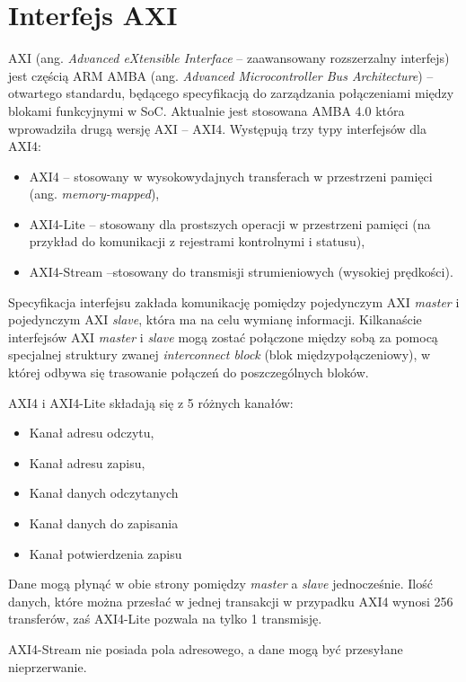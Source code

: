 \section{Interfejs AXI}
AXI (ang. \textit{Advanced eXtensible Interface} -- zaawansowany rozszerzalny interfejs) jest częścią ARM AMBA (ang.\textit{ Advanced Microcontroller Bus Architecture}) -- otwartego standardu, będącego specyfikacją do zarządzania połączeniami między blokami funkcyjnymi w SoC.
Aktualnie jest stosowana AMBA 4.0 która wprowadziła drugą wersję AXI -- AXI4.
Występują trzy typy interfejsów dla AXI4:
\begin{itemize}
\item AXI4 -- stosowany w wysokowydajnych transferach w przestrzeni pamięci (ang. \textit{memory-mapped}),
\item AXI4-Lite -- stosowany dla prostszych operacji w przestrzeni pamięci (na przykład do komunikacji z rejestrami kontrolnymi i statusu),
\item AXI4-Stream --stosowany do transmisji strumieniowych (wysokiej prędkości).
\end{itemize}
Specyfikacja interfejsu zakłada komunikację pomiędzy pojedynczym AXI \textit{master} i pojedynczym AXI \textit{slave}, która ma na celu wymianę informacji.
Kilkanaście interfejsów AXI \textit{master} i \textit{slave} mogą zostać połączone między sobą za pomocą specjalnej struktury zwanej \textit{interconnect block} (blok międzypołączeniowy), w której odbywa się trasowanie połączeń do poszczególnych bloków.

AXI4 i AXI4-Lite składają się z 5 różnych kanałów:
\begin{itemize}
\item Kanał adresu odczytu,
\item Kanał adresu zapisu,
\item Kanał danych odczytanych
\item Kanał danych do zapisania
\item Kanał potwierdzenia zapisu
\end{itemize}
Dane mogą płynąć w obie strony pomiędzy \textit{master} a \textit{slave} jednocześnie.
Ilość danych, które można przesłać w jednej transakcji w przypadku AXI4 wynosi 256 transferów, zaś AXI4-Lite pozwala na tylko 1 transmisję.


AXI4-Stream nie posiada pola adresowego, a dane mogą być przesyłane nieprzerwanie.
